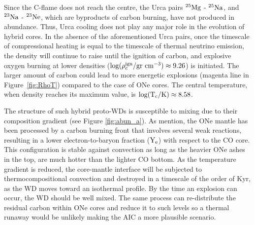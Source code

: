 \documentclass[../../main/thesis_msc.tex]{subfiles}
\begin{document}
        Since the C-flame does not reach the centre, the Urca pairs $\rm ^{25}Mg$ - $\rm ^{25}Na$, and $\rm ^{23}Na$ - $\rm ^{23}Ne$, which are byproducts of carbon burning, have not produced in abundance. Thus, Urca cooling does not play any major role in the evolution of hybrid cores. In the absence of the aforementioned Urca pairs, once the timescale of compressional heating is equal to the timescale of thermal neutrino emission, the density will continue to raise until the ignition of carbon, and explosive oxygen burning at lower densities ($\rm \log(\rho_c^{\rm ign} / \rm gr \ cm^{-3}) \approx 9.26$) is initiated. The larger amount of carbon could lead to more energetic explosions (magenta line in Figure\, \ref{fig:RhoT}) compared to the case of ONe cores. The central temperature, when density reaches its maximum value, is $\rm \log(T_c / \rm K) \approx 8.58$.
        
        The structure of such hybrid proto-WDs is susceptible to mixing due to their composition gradient (see Figure \ref{fig:abun_a}). As \cite{Brooks2017} mention, the ONe mantle has been processed by a carbon burning front that involves several weak reactions, resulting in a lower electron-to-baryon fraction ($\rm Y_e$) with respect to the CO core. This configuration is stable against convection as long as the heavier ONe ashes in the top, are much hotter than the lighter CO bottom. As the temperature gradient is reduced, the core-mantle interface will be subjected to thermocompositional convection and destroyed in a timescale of the order of Kyr, as the WD moves toward an isothermal profile. By the time an explosion can occur, the WD should be well mixed. The same process can re-distribute the residual carbon within ONe cores and reduce it to such levels so a thermal runaway would be unlikely making the AIC a more plausible scenario.

    
    
\end{document}
